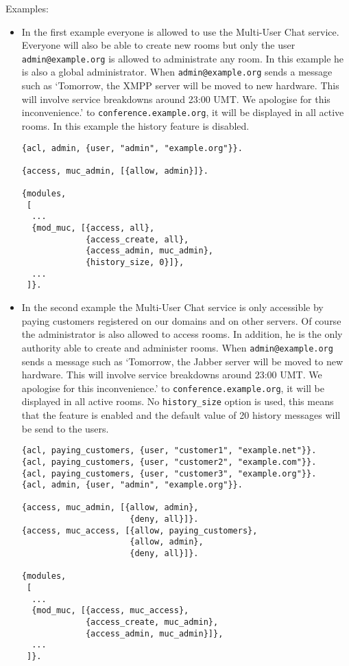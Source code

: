 \documentclass[a4paper,10pt]{book}
\newcommand{\jid}[1]{\texttt{#1}}
\newcommand{\term}[1]{\texttt{#1}}
\newcommand{\Jabber}{Jabber}
\newcommand{\XMPP}{XMPP}
\begin{document}
Examples:
\begin{itemize}
\item In the first example everyone is allowed to use the Multi-User Chat
  service. Everyone will also be able to create new rooms but only the user
  \jid{admin@example.org} is allowed to administrate any room. In this
  example he is also a global administrator. When \jid{admin@example.org}
  sends a message such as `Tomorrow, the \XMPP{} server will be moved
  to new hardware. This will involve service breakdowns around 23:00 UMT.
  We apologise for this inconvenience.' to \jid{conference.example.org},
  it will be displayed in all active rooms. In this example the history
  feature is disabled.
\begin{verbatim}
{acl, admin, {user, "admin", "example.org"}}.

{access, muc_admin, [{allow, admin}]}.

{modules,
 [
  ...
  {mod_muc, [{access, all},
             {access_create, all},
             {access_admin, muc_admin},
             {history_size, 0}]},
  ...
 ]}.
\end{verbatim}
\item In the second example the Multi-User Chat service is only accessible by
  paying customers registered on our domains and on other servers. Of course
  the administrator is also allowed to access rooms. In addition, he is the
  only authority able to create and administer rooms. When
  \jid{admin@example.org} sends a message such as `Tomorrow, the \Jabber{}
  server will be moved to new hardware. This will involve service breakdowns
  around 23:00 UMT. We apologise for this inconvenience.' to
  \jid{conference.example.org}, it will be displayed in all active rooms. No
  \term{history\_size} option is used, this means that the feature is enabled
  and the default value of 20 history messages will be send to the users.
\begin{verbatim}
{acl, paying_customers, {user, "customer1", "example.net"}}.
{acl, paying_customers, {user, "customer2", "example.com"}}.
{acl, paying_customers, {user, "customer3", "example.org"}}.
{acl, admin, {user, "admin", "example.org"}}.

{access, muc_admin, [{allow, admin},
                      {deny, all}]}.
{access, muc_access, [{allow, paying_customers},
                      {allow, admin},
                      {deny, all}]}.

{modules,
 [
  ...
  {mod_muc, [{access, muc_access},
             {access_create, muc_admin},
             {access_admin, muc_admin}]},
  ...
 ]}.
\end{verbatim}


\end{itemize}
\end{document}
